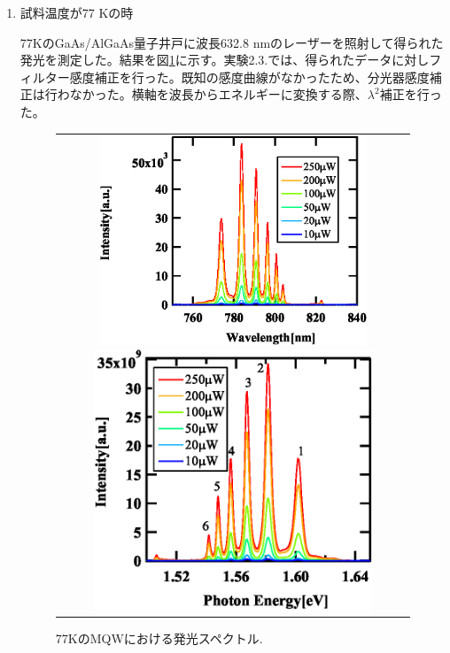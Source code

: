 \documentclass[11pt,a4j]{jsarticle}
\begin{document}
\begin{enumerate}
       \newpage
 \item 試料温度が77 Kの時

       77KのGaAs/AlGaAs量子井戸に波長632.8 nmのレーザーを照射して得られた発光を測定した。結果を図\ref{fig_mqw_77_spec1}に示す。実験2.3.では、得られたデータに対しフィルター感度補正を行った。既知の感度曲線がなかったため、分光器感度補正は行わなかった。横軸を波長からエネルギーに変換する際、$\lambda^2$補正を行った。


       \begin{figure}[ht]
        \centering
        \begin{tabular}{c}

         \begin{minipage}{0.52\hsize}

          \includegraphics[clip,width=8cm]{start2_MQW_77K_Spectrum_wav.eps}
         \end{minipage}

           \begin{minipage}{0.06\hsize}%
             \hspace{5mm}
           \end{minipage}

         \begin{minipage}{0.5\hsize}
          \centering
          \includegraphics[clip,width=8.3cm]{start2_MQW_77K_Spectrum_eV.eps}
         \end{minipage}
        \end{tabular}
        \caption{77KのMQWにおける発光スペクトル.}
        \label{fig_mqw_77_spec1}


\end{figure}
\end{enumerate}
\end{document}
